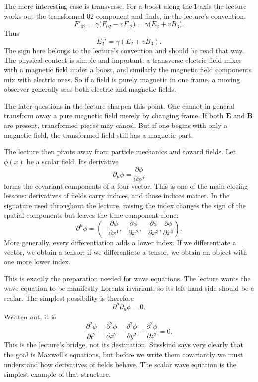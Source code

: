 The more interesting case is transverse. For a boost along the \(1\)-axis the lecture works out the transformed \(02\)-component and finds, in the lecture's convention,
\begin{equation}
F'_{02}
=
\gamma\bigl(F_{02}-vF_{12}\bigr)
=
\gamma\bigl(E_2+vB_3\bigr).
\end{equation}
Thus
\begin{equation}
E_2'=\gamma(E_2+vB_3).
\end{equation}
The sign here belongs to the lecture's convention and should be read that way. The physical content is simple and important: a transverse electric field mixes with a magnetic field under a boost, and similarly the magnetic field components mix with electric ones. So if a field is purely magnetic in one frame, a moving observer generally sees both electric and magnetic fields.

The later questions in the lecture sharpen this point. One cannot in general transform away a pure magnetic field merely by changing frame. If both \(\mathbf E\) and \(\mathbf B\) are present, transformed pieces may cancel. But if one begins with only a magnetic field, the transformed field still has a magnetic part.

The lecture then pivots away from particle mechanics and toward fields. Let \(\phi(x)\) be a scalar field. Its derivative
\begin{equation}
\partial_\mu\phi=\frac{\partial\phi}{\partial x^\mu}
\end{equation}
forms the covariant components of a four-vector. This is one of the main closing lessons: derivatives of fields carry indices, and those indices matter. In the signature used throughout the lecture, raising the index changes the sign of the spatial components but leaves the time component alone:
\begin{equation}
\partial^\mu\phi
=
\left(
-\frac{\partial\phi}{\partial x^1},
-\frac{\partial\phi}{\partial x^2},
-\frac{\partial\phi}{\partial x^3},
\frac{\partial\phi}{\partial x^0}
\right).
\end{equation}
More generally, every differentiation adds a lower index. If we differentiate a vector, we obtain a tensor; if we differentiate a tensor, we obtain an object with one more lower index.

This is exactly the preparation needed for wave equations. The lecture wants the wave equation to be manifestly Lorentz invariant, so its left-hand side should be a scalar. The simplest possibility is therefore
\begin{equation}
\partial^\mu\partial_\mu\phi=0.
\end{equation}
Written out, it is
\begin{equation}
\frac{\partial^2\phi}{\partial t^2}
-
\frac{\partial^2\phi}{\partial x^2}
-
\frac{\partial^2\phi}{\partial y^2}
-
\frac{\partial^2\phi}{\partial z^2}
=
0.
\end{equation}
This is the lecture's bridge, not its destination. Susskind says very clearly that the goal is Maxwell's equations, but before we write them covariantly we must understand how derivatives of fields behave. The scalar wave equation is the simplest example of that structure.


